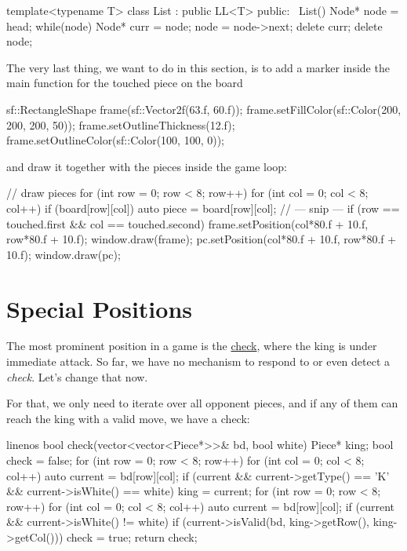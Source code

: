 \begin{cpp}
template<typename T>
class List : public LL<T> {
public:
  ~List() {
    Node* node = head;
    while(node) {
      Node* curr = node;
      node = node->next;
      delete curr;
    }
    delete node;
  }
}
\end{cpp}

The very last thing, we want to do in this section, is to add a marker inside the main function for the
touched piece on the board

\begin{cpp}
sf::RectangleShape frame(sf::Vector2f(63.f, 60.f));
frame.setFillColor(sf::Color(200, 200, 200, 50));
frame.setOutlineThickness(12.f);
frame.setOutlineColor(sf::Color(100, 100, 0));
\end{cpp}

and draw it together with the pieces inside the game loop:

\begin{cpp}
// draw pieces
for (int row = 0; row < 8; row++) {
  for (int col = 0; col < 8; col++) {
    if (board[row][col]) {
      auto piece = board[row][col];
      // --- snip ---
      if (row == touched.first && col == touched.second) {
        frame.setPosition(col*80.f + 10.f, row*80.f + 10.f);
        window.draw(frame);
      }
      pc.setPosition(col*80.f + 10.f, row*80.f + 10.f);
      window.draw(pc);
    }
  }
}
\end{cpp}

\section{Special Positions}\label{sec:specpos}

The most prominent position in a game is the \href{https://en.wikipedia.org/wiki/Check_(chess)}{check},
where the king is under immediate attack.
So far, we have no mechanism to respond to or even detect a \emph{check}.
Let's change that now.

For that, we only need to iterate over all opponent pieces, and if any of them can reach the king
with a valid move, we have a check:

\begin{cpp*}{linenos}
bool check(vector<vector<Piece*>>& bd, bool white) {
  Piece* king;
  bool check = false;
  for (int row = 0; row < 8; row++) {
    for (int col = 0; col < 8; col++) {
      auto current = bd[row][col];
      if (current && current->getType() == 'K' &&
          current->isWhite() == white)
      {
        king = current;
      }
    }
  }
  for (int row = 0; row < 8; row++) {
    for (int col = 0; col < 8; col++) {
      auto current = bd[row][col];
      if (current && current->isWhite() != white) {
        if (current->isValid(bd, king->getRow(), king->getCol())) {
          check = true;
        }
      }
    }
  }
  return check;
}
\end{cpp*}

